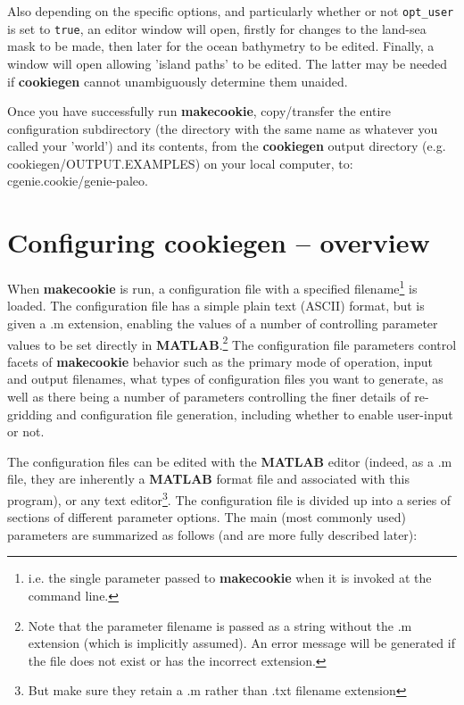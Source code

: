 \vspace{2mm}
Also depending on the specific options, and particularly whether or not \texttt{opt\_user} is set to \texttt{true}, an editor window will open, firstly for changes to the land-sea mask to be made, then later for the ocean bathymetry to be edited. Finally, a window will open allowing 'island paths' to be edited. The latter may be needed if \textbf{cookiegen} cannot unambiguously determine them unaided.

Once you have successfully run \textbf{makecookie}, copy/transfer the entire  configuration subdirectory (the directory with the same name as whatever you called your 'world')  and its contents, from the \textbf{cookiegen} output directory (e.g. \textsf{\footnotesize cookiegen/OUTPUT.EXAMPLES}) on your local computer, to: \textsf{\footnotesize cgenie.cookie/genie-paleo}.


\newpage

\section{Configuring cookiegen -- overview}


When \textbf{makecookie} is run, a configuration file with a specified filename\footnote{i.e. the single parameter passed to \textbf{makecookie} when it is invoked at the command line.} is loaded. The configuration file has a simple plain text (ASCII) format, but is given a \textsf{\footnotesize .m} extension, enabling the values of a number of controlling parameter values to be set directly in \textbf{MATLAB}.\footnote{Note that the parameter filename is passed as a string without the .m extension (which is implicitly assumed). An error message will be generated if the file does not exist or has the incorrect extension.} The configuration file parameters control facets of \textbf{makecookie} behavior such as the primary mode of operation, input and output filenames, what types of configuration files you want to generate, as well as there being a number of parameters controlling the finer details of re-gridding and configuration file generation, including whether to enable user-input or not.

The configuration files can be edited with the \textbf{MATLAB} editor (indeed, as a \textsf{\footnotesize .m} file, they are inherently a \textbf{MATLAB} format file and associated with this program), or any  text editor\footnote{But make sure they retain a \textsf{\small .m} rather than \textsf{\small .txt} filename extension}. The configuration file is divided up into a series of sections of different parameter options. The main (most commonly used) parameters are summarized as follows (and are more fully described later):

